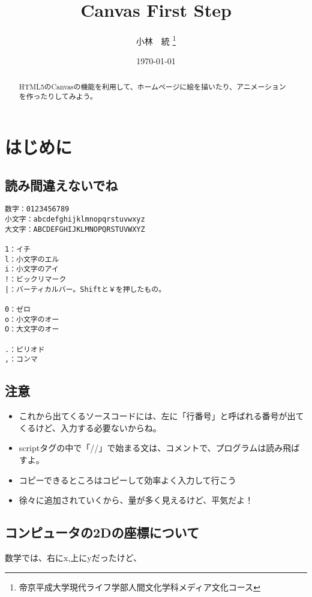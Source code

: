 \documentclass[mingoth,11pt,a4j,uplatex]{jsarticle}
\title{Canvas First Step}
\author{小林　統 \thanks{帝京平成大学現代ライフ学部人間文化学科メディア文化コース}}
\date{\today}
\begin{document}

\maketitle

\begin{abstract}
HTML5のCanvasの機能を利用して、ホームページに絵を描いたり、アニメーションを作ったりしてみよう。
\end{abstract}

\tableofcontents
\newpage

\section{はじめに}
\subsection{読み間違えないでね}

\begin{lstlisting}[caption=読み間違えないでね]
数字：0123456789
小文字：abcdefghijklmnopqrstuvwxyz
大文字：ABCDEFGHIJKLMNOPQRSTUVWXYZ

1：イチ
l：小文字のエル
i：小文字のアイ
!：ビックリマーク
|：バーティカルバー。Shiftと￥を押したもの。

0：ゼロ
o：小文字のオー
O：大文字のオー

.：ピリオド
,：コンマ
\end{lstlisting}

\subsection{注意}
\begin{itemize}
\item これから出てくるソースコードには、左に「行番号」と呼ばれる番号が出てくるけど、入力する必要ないからね。

\item scriptタグの中で「//」で始まる文は、コメントで、プログラムは読み飛ばすよ。

\item コピーできるところはコピーして効率よく入力して行こう
\item 徐々に追加されていくから、量が多く見えるけど、平気だよ！
\end{itemize}

\subsection{コンピュータの2Dの座標について}
数学では、右にx,上にyだったけど、
\end{document}
